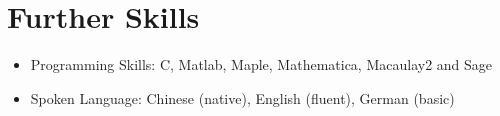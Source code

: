 \documentclass[a4paper,12pt]{article}
\begin{document}
\section*{\Large{Further Skills}}
\begin{itemize}
 \item Programming Skills: C, Matlab, Maple, Mathematica, Macaulay2 and Sage
 \item Spoken Language: Chinese (native), English (fluent), German (basic)
\end{itemize}

% 
\end{document}
